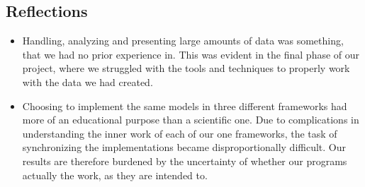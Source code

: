 \subsection{Reflections}

\begin{itemize}
    \item Handling, analyzing and presenting large amounts of data was
        something, that we had no prior experience in. This was evident in the
        final phase of our project, where we struggled with the tools and
        techniques to properly work with the data we had created.
    \item Choosing to implement the same models in three different frameworks
        had more of an educational purpose than a scientific one. Due to
        complications in understanding the inner work of each of our one
        frameworks, the task of synchronizing the implementations became
        disproportionally difficult. Our results are therefore burdened by the
        uncertainty of whether our programs actually the work, as they are
        intended to.
\end{itemize}

\pagebreak
